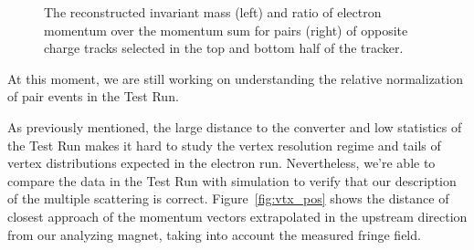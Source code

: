 \begin{figure}[ht]
\caption{\small{The reconstructed invariant mass (left) and ratio of electron momentum over the momentum sum for pairs (right) of opposite charge tracks selected in the top and bottom half of the tracker.}}
\label{fig:pair_kin}
\end{figure}
At this moment, we are still working on understanding the relative normalization of pair events in the Test 
Run. 

As previously mentioned, the large distance to the converter and low statistics of the Test Run makes it hard 
to study the vertex resolution regime and tails of vertex distributions expected in the electron run. 
Nevertheless, we're able to compare the data in the Test Run with simulation to verify that our description 
of the multiple scattering is correct. 
Figure~\ref{fig:vtx_pos} shows the distance of closest approach of the momentum vectors extrapolated in the 
upstream direction from our analyzing magnet, taking into account the measured fringe field. 
